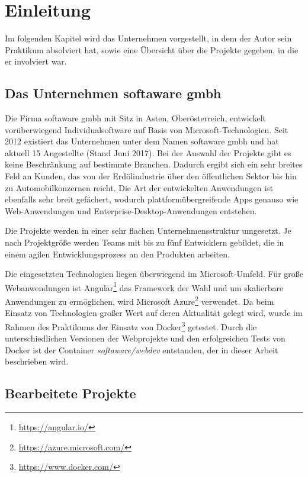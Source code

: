 \chapter{Einleitung}
\label{cha:introduction}

Im folgenden Kapitel wird das Unternehmen vorgestellt, in dem der Autor sein Praktikum absolviert hat, sowie eine Übersicht über die Projekte gegeben, in die er involviert war.

\section{Das Unternehmen softaware gmbh}
\label{sec:softaware}
Die Firma softaware gmbh mit Sitz in Asten, Oberösterreich, entwickelt vorüberwiegend Individualsoftware auf Basis von Microsoft-Technologien.
Seit 2012 existiert das Unternehmen unter dem Namen softaware gmbh und hat aktuell 15 Angestellte (Stand Juni 2017).
Bei der Auswahl der Projekte gibt es keine Beschränkung auf bestimmte Branchen.
Dadurch ergibt sich ein sehr breites Feld an Kunden, das von der Erdölindustrie über den öffentlichen Sektor bis hin zu Automobilkonzernen reicht.
Die Art der entwickelten Anwendungen ist ebenfalls sehr breit gefächert, wodurch plattformübergreifende Apps genauso wie Web-Anwendungen und Enterprise-Desktop-Anwendungen entstehen.

Die Projekte werden in einer sehr flachen Unternehmensstruktur umgesetzt.
Je nach Projektgröße werden Teams mit bis zu fünf Entwicklern gebildet, die in einem agilen Entwicklungsprozess an den Produkten arbeiten.

Die eingesetzten Technologien liegen überwiegend im Microsoft-Umfeld.
Für große Webanwendungen ist Angular\footnote{\url{https://angular.io/}} das Framework der Wahl und um skalierbare Anwendungen zu ermöglichen, wird Microsoft Azure\footnote{\url{https://azure.microsoft.com/}} verwendet.
Da beim Einsatz von Technologien großer Wert auf deren Aktualität gelegt wird, wurde im Rahmen des Praktikums der Einsatz von Docker\footnote{\url{https://www.docker.com/}} getestet.
Durch die unterschiedlichen Versionen der Webprojekte und den erfolgreichen Tests von Docker ist der Container \emph{softaware/webdev} entstanden, der in dieser Arbeit beschrieben wird.


\section{Bearbeitete Projekte}
\label{sec:projects}

